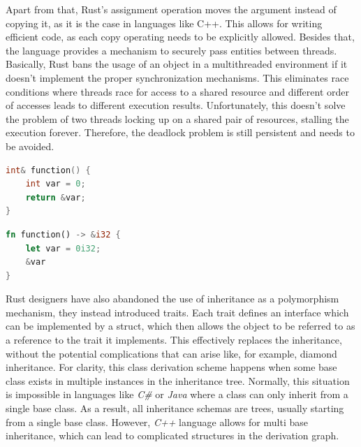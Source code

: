 Apart from that, Rust's assignment operation moves the argument instead of copying it, as it is the case in languages like C++. This allows for writing efficient code, as each copy operating needs to be explicitly allowed. Besides that, the language provides a mechanism to securely pass entities between threads. Basically, Rust bans the usage of an object in a multithreaded environment if it doesn't implement the proper synchronization mechanisms. This eliminates race conditions where threads race for access to a shared resource and different order of accesses leads to different execution results. Unfortunately, this doesn't solve the problem of two threads locking up on a shared pair of resources, stalling the execution forever. Therefore, the deadlock problem is still persistent and needs to be avoided. 

\begin{minipage}{.4\textwidth}
    \begin{lstlisting}[language=c++,caption={Example of a memory corruption bug in C++},captionpos=b,label={badcpp}]
int& function() {
    int var = 0;
    return &var;
}
    \end{lstlisting} 
\end{minipage}
\hfill\vline\hfill
\begin{minipage}{.4\textwidth}
    \begin{lstlisting}[language=rust,caption={Replicating a memory corruption bug in Rust},captionpos=b,label={badrust}]
fn function() -> &i32 {
    let var = 0i32;
    &var
} 
    \end{lstlisting}
\end{minipage}

Rust designers have also abandoned the use of inheritance as a polymorphism mechanism, they instead introduced traits. Each trait defines an interface which can be implemented by a struct, which then allows the object to be referred to as a reference to the trait it implements. This effectively replaces the inheritance, without the potential complications that can arise like, for example, diamond inheritance. For clarity, this class derivation scheme happens when some base class exists in multiple instances in the inheritance tree. Normally, this situation is impossible in languages like \textit{C\#} or \textit{Java} where a class can only inherit from a single base class. As a result, all inheritance schemas are trees, usually starting from a single base class. However, \textit{C++} language allows for multi base inheritance, which can lead to complicated structures in the derivation graph.


